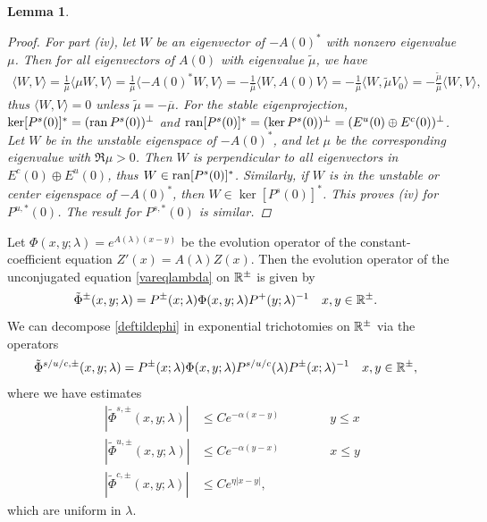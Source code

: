 \documentclass[12pt]{elsarticle}
\theoremstyle{plain}
\newtheorem{lemma}[theorem]{Lemma}
\theoremstyle{definition}
\theoremstyle{remark}
\numberwithin{theorem}{section}
\numberwithin{equation}{section}
\begin{document}
\begin{lemma}
\begin{proof}
For part (iv), let $W$ be an eigenvector of $-A(0)^*$ with nonzero eigenvalue $\mu$. Then for all eigenvectors of $A(0)$ with eigenvalue $\tilde{\mu}$, we have 
\begin{align*}
\langle W, V \rangle = \frac{1}{\overline{\mu}} \langle \mu W, V \rangle
= \frac{1}{\overline{\mu}}\langle -A(0)^* W, V \rangle = -\frac{1}{\overline{\mu}}\langle W, A(0) V \rangle = -\frac{1}{\overline{\mu}}\langle W, \tilde{\mu} V_0 \rangle = -\frac{\tilde{\mu}}{\overline{\mu}}\langle W, V \rangle,
\end{align*}
thus $\langle W, V \rangle = 0$ unless $\tilde{\mu} = -\overline{\mu}$. For the stable eigenprojection, $\mathop\mathrm{ker}\nolimits [P^s(0)]^* = (\operatorname{ran} P^s(0))^\perp$ and $\operatorname{ran} [P^s(0)]^* = (\mathop\mathrm{ker}\nolimits P^s(0))^\perp = (E^u(0) \oplus E^c(0))^\perp$. Let $W$ be in the unstable eigenspace of $-A(0)^*$, and let $\mu$ be the corresponding eigenvalue with $\Re \mu > 0$. Then $W$ is perpendicular to all eigenvectors in $E^c(0) \oplus E^u(0)$, thus $W \in \operatorname{ran} [P^s(0)]^*$. Similarly, if $W$ is in the unstable or center eigenspace of $-A(0)^*$, then $W \in \ker [P^s(0)]^*$. This proves (iv) for $P^{u,*}(0)$. The result for $P^{s,*}(0)$ is similar.
\end{proof}
\end{lemma}

Let $\Phi(x, y; \lambda) = e^{A(\lambda)(x-y)}$ be the evolution operator of the constant-coefficient equation $Z'(x) = A(\lambda) Z(x)$. Then the evolution operator of the unconjugated equation \cref{vareqlambda} on $\mathbb{R}^\pm$ is given by
\begin{align}\label{deftildephi}
\tilde{\Phi}^\pm(x, y; \lambda) &= P^\pm(x; \lambda) \Phi(x, y; \lambda) P^+(y; \lambda)^{-1} && x, y \in \mathbb{R}^\pm.
\end{align}
We can decompose \cref{deftildephi} in exponential trichotomies on $\mathbb{R}^\pm$ via the operators
\begin{align}\label{tildephitrich}
\tilde{\Phi}^{s/u/c, \pm}(x, y; \lambda) &= P^\pm(x; \lambda) \Phi(x, y; \lambda) P^{s/u/c}(\lambda) P^\pm(x; \lambda)^{-1} && x, y \in \mathbb{R}^\pm,
\end{align}
where we have estimates
\begin{equation}\label{stdtrichbounds}
\begin{aligned}
|\tilde{\Phi}^{s,\pm}(x, y; \lambda)| &\leq C e^{-\alpha(x - y)} \qquad\qquad y \leq x \\
|\tilde{\Phi}^{u,\pm}(x, y; \lambda)| &\leq C e^{-\alpha(y - x)} \qquad\qquad x \leq y \\
|\tilde{\Phi}^{c,\pm}(x, y; \lambda)| &\leq C e^{\eta|x - y|},
\end{aligned}
\end{equation}
which are uniform in $\lambda$. 
\end{document}
